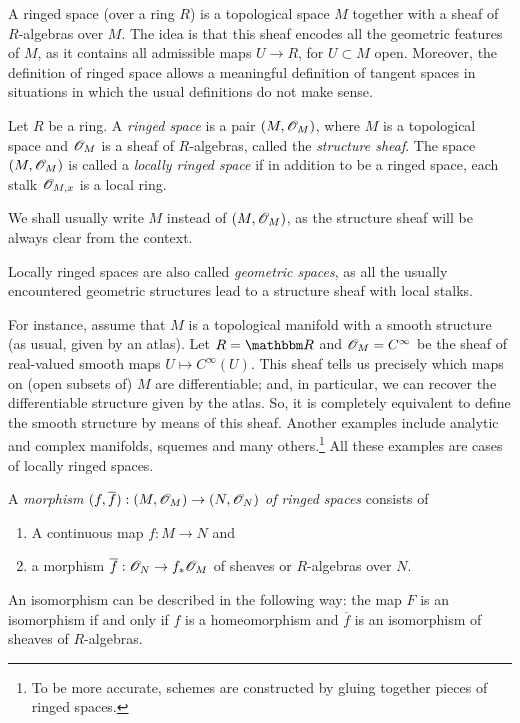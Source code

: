 A ringed space (over a ring $R$) is a topological space $M$ together with a sheaf of $R$-algebras over $M$. The idea is that this sheaf encodes all the geometric features of $M$, as it contains all admissible maps $U\to R$, for $U\subset M$ open. Moreover, the definition of ringed space allows a meaningful definition of tangent spaces in situations in which the usual definitions do not make sense.

\begin{defi}
Let $R$ be a ring. A \emph{ringed space} is a pair $(M,\mathscr{O}_M)$, where $M$ is a topological space and $\mathscr{O}_M$ is a sheaf of $R$-algebras, called the \emph{structure sheaf}. The space $(M,\mathscr{O}_M)$ is called a \emph{locally ringed space} if in addition to be a ringed space, each stalk $\mathscr{O}_{M,x}$ is a local ring.
\end{defi}

We shall usually write $M$ instead of $(M,\mathscr{O}_M)$, as the structure sheaf will be always clear from the context.

Locally ringed spaces are also called \emph{geometric spaces}, as all the usually encountered geometric structures lead to a structure sheaf with local stalks.

For instance, assume that $M$ is a topological manifold with a smooth structure (as usual, given by an atlas). Let $R=\re$ and $\mathscr{O}_{M}=C^\infty$ be the sheaf of real-valued smooth maps $U\mapsto C^\infty (U)$. This sheaf tells us precisely which maps on (open subsets of) $M$ are differentiable; and, in particular, we can recover the differentiable structure given by the atlas. So, it is completely equivalent to define the smooth structure by means of this sheaf. Another examples include analytic and complex manifolds, squemes and many others.\footnote{To be more accurate, schemes are constructed by gluing together pieces of ringed spaces.} All these examples are cases of locally ringed spaces.

\begin{defi}
A \emph{morphism} $(f,\overline{f}):(M,\mathscr{O}_M)\to (N,\mathscr{O}_N)$ \emph{of ringed spaces} consists of
\begin{enumerate}
\item A continuous map $f:M\to N$ and
\item a morphism $\overline{f}:\mathscr{O}_N\to f_*\mathscr{O}_M$ of sheaves or $R$-algebras over $N$.
\end{enumerate}
\end{defi}

An isomorphism can be described in the following way: the map $F$ is an isomorphism if and only if $f$ is a homeomorphism and $\overline{f}$ is an isomorphism of sheaves of $R$-algebras.

